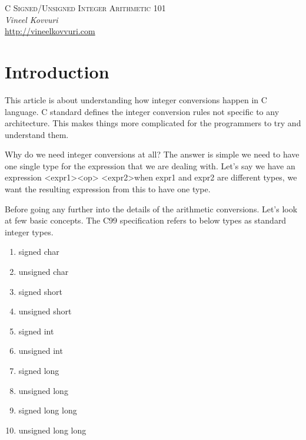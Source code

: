 \documentclass{article}
\begin{document}
\begin{titlepage}
   \begin{center}
      \Large\textsc{C Signed/Unsigned Integer Arithmetic 101}\\
      \vspace{5mm}
      \Large\textit{Vineel Kovvuri}\\
      \url{http://vineelkovvuri.com}\\
   \end{center}
\end{titlepage}

\tableofcontents

\newpage
\section{Introduction}
This article is about understanding how integer conversions happen in C
language. C standard defines the integer conversion rules not specific to any
architecture. This makes things more complicated for the programmers to try and
understand them.

Why do we need integer conversions at all? The answer is simple we need to have
one single type for the expression that we are dealing with. Let's say we have
an expression \textless expr1\textgreater \textless op\textgreater
\textless expr2\textgreater  when expr1 and expr2 are different types, we
want the resulting expression from this to have one type.

Before going any further into the details of the arithmetic conversions. Let's
look at few basic concepts. The C99 specification refers to below types as
standard integer types.

\begin{enumerate}[noitemsep]
    \item signed char
    \item unsigned char
    \item signed short
    \item unsigned short
    \item signed int
    \item unsigned int
    \item signed long
    \item unsigned long
    \item signed long long
    \item unsigned long long
\end{enumerate}
\end{document}
